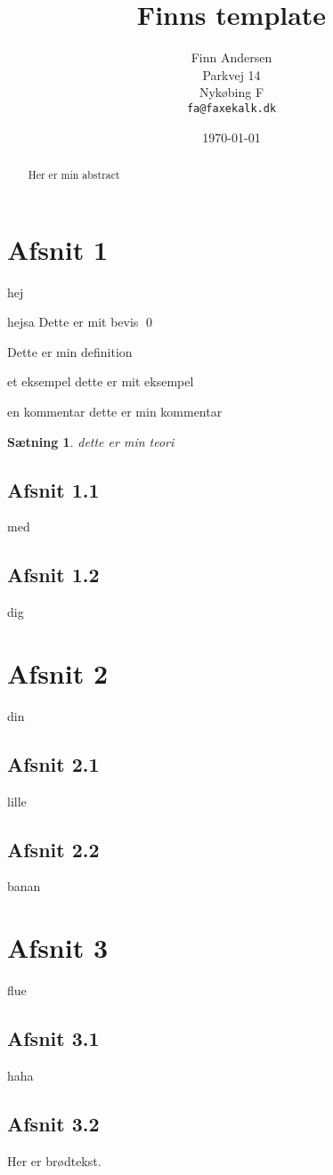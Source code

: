 \documentclass{article}%
\title{Finns template}
\author{Finn Andersen\\Parkvej 14\\Nyk{\o}bing F\\\texttt{fa@faxekalk.dk}}
\date{\today}
\newtheorem{theorem}{Sætning}[section]
\newenvironment{Finnproof}[1][Bevis]{\begin{trivlist}
\item[\hskip \labelsep {\bfseries #1}]}{\end{trivlist}}
\newenvironment{definition}[1][Definition]{\begin{trivlist}
\item[\hskip \labelsep {\bfseries #1}]}{\end{trivlist}}
\newenvironment{example}[1][Example]{\begin{trivlist}
\item[\hskip \labelsep {\bfseries #1}]}{\end{trivlist}}
\newenvironment{remark}[1][Remark]{\begin{trivlist}
\item[\hskip \labelsep {\bfseries #1}]}{\end{trivlist}}
\newcommand{\Finnqed}{\nobreak \ifvmode \relax \else
      \ifdim\lastskip<1.5em \hskip-\lastskip
      \hskip1.5em plus0em minus0.5em \fi \nobreak
      \vrule height0.75em width0.5em depth0.25em\fi}
\begin{document}
\maketitle
\renewcommand{\abstractname}{Opgaveformulering}%
\begin{abstract}
Her er min abstract
\end{abstract}

\section{Afsnit 1}
hej
\begin{Finnproof}{hejsa}
Dette er mit bevis
\qed
\Finnqed
\end{Finnproof}

\begin{definition}
Dette er min definition
\end{definition}


\begin{example}{et eksempel}
dette er mit eksempel
\end{example}

\begin{remark}{en kommentar}
dette er min kommentar
\end{remark}

\begin{theorem}%
dette er min teori
\end{theorem}

\subsection{Afsnit 1.1}
med
\subsection{Afsnit 1.2}
dig
\section{Afsnit 2}
din
\subsection{Afsnit 2.1}
lille
\subsection{Afsnit 2.2}
banan
\section{Afsnit 3}
flue
\subsection{Afsnit 3.1}
haha
\subsection{Afsnit 3.2}
Her er brødtekst.

\tableofcontents 
\end{document}
